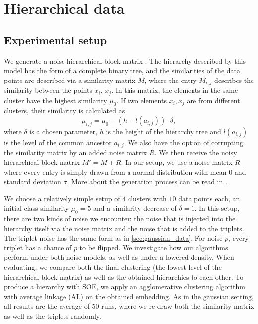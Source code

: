 
\FloatBarrier
\section{Hierarchical data}\label{sec:hierarchical_data}
\subsection{Experimental setup}\label{sec:hierarchical_setup}
We generate a noise hierarchical block matrix \citep{balakrishnanNoiseThresholdsSpectral2011}.
The hierarchy described by this model has the form of a complete binary tree, and the similarities of the data points are described via a similarity matrix $M$, 
where the entry $M_{i,j}$ describes the similarity between the points $x_i$, $x_j$.
In this matrix, the elements in the same cluster have the highest similarity $\mu_0$. If two elements $x_i, x_j$ are from different clusters,
their similarity is calculated as 
\[
\mu_{i,j} = \mu_0 - (h - l(a_{i,j})) \cdot \delta
,\] 
where $\delta$ is a chosen parameter, $h$ is the height of the hierarchy tree and $l(a_{i,j})$
is the level of the common ancestor $a_{i,j}$.
We also have the option of corrupting the similarity matrix by 
an added noise matrix $R$. We then receive the noisy hierarchical block matrix $M' = M + R$. 
In our setup, we use a noise matrix $R$ where every entry is simply drawn from a normal distribution with mean $0$ and standard deviation $\sigma$.
More about the generation process can be read in \cite{ghoshdastidarFoundationsComparisonBasedHierarchical2019}.

We choose a relatively simple setup of $4$ clusters with $10$ data points each, an initial class similarity $\mu_0 = 5$ and a similarity decrease of $\delta = 1$.
In this setup, there are two kinds of noise we encounter: the noise that is injected into the hierarchy itself via the noise matrix and the noise that is added to the triplets.
The triplet noise has the same form as in \autoref{sec:gaussian_data}. For noise $p$, every triplet has a chance of $p$ to be flipped. 
We investigate how our algorithms perform under both noise models, as well as under a lowered density.  
When evaluating, we compare both the final clustering (the lowest level of the hierarchical block matrix) as well as the obtained hierarchies to each other. 
To produce a hierarchy with SOE, we apply an agglomerative clustering algorithm with average linkage (AL) on the obtained embedding.
As in the gaussian setting, all results are the average of $50$ runs, where we re-draw both the similarity matrix as well as the triplets randomly. 

